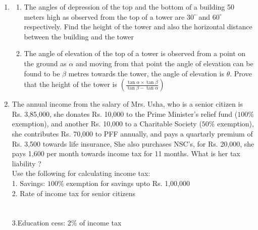 \documentclass[journal,12pt,twocolumn]{IEEEtran}
\renewcommand\thesection{\arabic{section}}
\begin{document}
\begin{enumerate}[label=\thesection.\arabic*.,ref=\thesection.\theenumi]
\item \begin{enumerate}
\item The angles of depression of the top and the bottom of a building 50 meters high as observed from the top of a tower are $30^\circ$ and $60^\circ$ respectively. Find the height of the tower and also the horizontal distance between the building and the tower\\
\item The angle of elevation of the top of a tower is observed from a point on the ground as $\alpha$ and moving from that point the angle of elevation can be found to be $\beta$ metres towards the tower, the angle of elevation is $\theta$. Prove that the height of the tower is $( \frac{\tan \alpha \times \tan \beta}{\tan \beta - \tan \alpha})$ \\
\end{enumerate}
\item The annual income from the salary of Mrs. Usha, who is a senior citizen is Rs. 3,85,000, she donates Rs. 10,000 to the Prime Minister's relief fund ($100\%$ exemption), and another Rs. 10,000 to a Charitable Society ($50\%$ exemption), she contributes Rs. 70,000 to PFF annually, and pays a quartarly premium of Rs. 3,500 towards life insurance, She also purchases NSC's, for Rs. 20,000, she pays 1,600 per month towards income tax for 11 months. What is her tax liability ?\\
Use the following for calculating income tax:\\
1. Savings: $100\%$ exemption for savings upto Rs. 1,00,000\\
2. Rate of income tax for senior citizens\\
\vspace{1mm}\\
\vspace{1mm}\\
3.Education cess: 2\% of  income tax\\
\end{enumerate}
\end{document}
